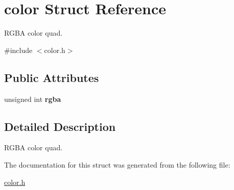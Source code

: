 \hypertarget{structcolor}{}\section{color Struct Reference}
\label{structcolor}


R\+G\+BA color quad.  




{\ttfamily \#include $<$color.\+h$>$}

\subsection*{Public Attributes}
\begin{DoxyCompactItemize}
\item 
\mbox{\label{structcolor_a85486e049f28315870cc6ef7a2592081}} 
unsigned int {\bfseries rgba}
\end{DoxyCompactItemize}


\subsection{Detailed Description}
R\+G\+BA color quad. 

The documentation for this struct was generated from the following file\+:\begin{DoxyCompactItemize}
\item 
\hyperlink{color_8h}{color.\+h}\end{DoxyCompactItemize}
